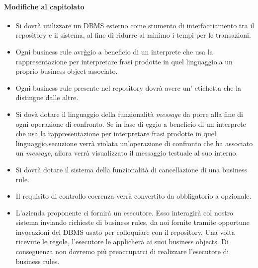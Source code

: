 \documentclass[11pt,titlepage,a4paper]{report}
\begin{document}
\paragraph{Modifiche al capitolato}

\begin{itemize}

\item Si dovr\`a utilizzare un DBMS esterno come stumento di interfacciamento tra il repository e il sistema, al fine di ridurre al minimo i tempi per le transazioni.

\item Ogni business rule avr\`ggio a beneficio di un interprete che usa la rappresentazione per interpretare frasi prodotte in quel linguaggio.a un proprio business object associato.

\item Ogni business rule presente nel repository dovr\`a avere un' etichetta che la distingue dalle altre.

\item Si dov\`a dotare il linguaggio della funzionalit\`a \textit{message} da porre alla fine di ogni operazione di confronto. Se in fase di eggio a beneficio di un interprete che usa la rappresentazione per interpretare frasi prodotte in quel linguaggio.secuzione verr\`a violata un'operazione di confronto che ha associato un \textit{message}, allora verr\`a visualizzato il messaggio testuale al suo interno.

\item Si dovr\`a dotare il sistema della funzionalit\`a di cancellazione di una business rule.

\item Il requisito di controllo coerenza verr\`a convertito da obbligatorio a opzionale.

\item L'azienda proponente ci fornir\`a un esecutore. Esso interagir\`a col nostro sistema inviando richieste di business rules, da noi fornite tramite opportune invocazioni del DBMS usato per colloquiare con il repository. Una volta ricevute le regole, l'esecutore le applicher\`a ai suoi business objects. Di conseguenza non dovremo pi\`u preoccuparci di realizzare l'esecutore di business rules.
\end{itemize}
\end{document}
